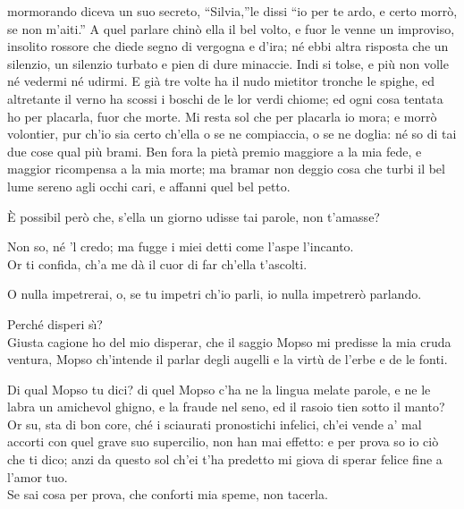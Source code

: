 \documentclass{book}
\begin{document}
	mormorando diceva un suo secreto,
	``Silvia,''le dissi ``io per te ardo, e certo
	morr\`o, se non m'aiti.'' A quel parlare
	chin\`o ella il bel volto, e fuor le venne
	un improviso, insolito rossore
	che diede segno di vergogna e d'ira;
	n\'e ebbi altra risposta che un silenzio,
	un silenzio turbato e pien di dure
	minaccie. Indi si tolse, e pi\`u non volle
	n\'e vedermi n\'e udirmi. E gi\`a tre volte
	ha il nudo mietitor tronche le spighe,
	ed altretante il verno ha scossi i boschi
	de le lor verdi chiome; ed ogni cosa
	tentata ho per placarla, fuor che morte.
	Mi resta sol che per placarla io mora;
	e morr\`o volontier, pur ch'io sia certo
	ch'ella o se ne compiaccia, o se ne doglia:
	n\'e so di tai due cose qual pi\`u brami.
	Ben fora la piet\`a premio maggiore
	a la mia fede, e maggior ricompensa
	a la mia morte; ma bramar non deggio
	cosa che turbi il bel lume sereno
	agli occhi cari, e affanni quel bel petto.

	\5 \`E possibil per\`o che, s'ella un giorno
	udisse tai parole, non t'amasse?

	\4 Non so, n\'e 'l credo; ma fugge i miei detti
	come l'aspe l'incanto. \\

   \5 Or ti confida,
	ch'a me d\`a il cuor di far ch'ella t'ascolti.

	\4 O nulla impetrerai, o, se tu impetri
	ch'io parli, io nulla impetrer\`o parlando.

	\5 Perch\'e disperi s\`{\i}? \\

   \4 Giusta cagione
	ho del mio disperar, che il saggio Mopso
	mi predisse la mia cruda ventura,
	Mopso ch'intende il parlar degli augelli
	e la virt\`u de l'erbe e de le fonti.

	\5 Di qual Mopso tu dici? di quel Mopso
	c'ha ne la lingua melate parole,
	e ne le labra un amichevol ghigno,
	e la fraude nel seno, ed il rasoio
	tien sotto il manto? Or su, sta di bon core,
	ch\'e i sciaurati pronostichi infelici,
	ch'ei vende a' mal accorti con quel grave
	suo supercilio, non han mai effetto:
	e per prova so io ci\`o che ti dico;
	anzi da questo sol ch'ei t'ha predetto
	mi giova di sperar felice fine
	a l'amor tuo. \\

   \4 Se sai cosa per prova,
	che conforti mia speme, non tacerla.
\end{document}
